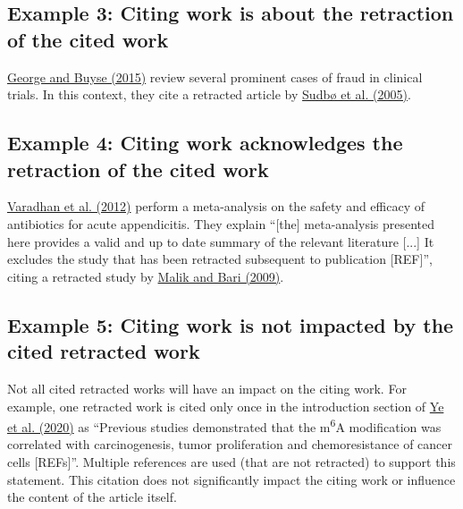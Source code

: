 \documentclass[letterpaper, 12pt]{article}
\begin{document}
\subsection*{Example 3: Citing work is about the retraction of the cited work}
\href{https://pmc.ncbi.nlm.nih.gov/articles/PMC4340084/}{George and Buyse (2015)} review several prominent cases of fraud in clinical trials. In this context, they cite a retracted article by \href{https://doi.org/10.1016/S0140-6736(05)67488-0}{Sudb\o{} et al. (2005)}.

\subsection*{Example 4: Citing work acknowledges the retraction of the cited work}
\href{https://doi.org/10.1136/bmj.e2156}{Varadhan et al. (2012)} perform a meta-analysis on the safety and efficacy of antibiotics for acute appendicitis. They explain ``[the] meta-analysis presented here provides a valid and up to date summary of the relevant literature [...] It excludes the study that has been retracted subsequent to publication [REF]'', citing a retracted study by \href{https://doi.org/10.1007/s11605-009-0835-5}{Malik and Bari (2009)}. 

\subsection*{Example 5: Citing work is not impacted by the cited retracted work}

Not all cited retracted works will have an impact on the citing work. For example, one retracted work is cited only once in the introduction section of \href{https://doi.org/10.7150/thno.51231}{Ye et al. (2020)} as ``Previous studies demonstrated that the m\textsuperscript{6}A modification was correlated with carcinogenesis, tumor proliferation and chemoresistance of cancer cells [REFs]''. Multiple references are used (that are not retracted) to support this statement. This citation does not significantly impact the citing work or influence the content of the article itself.
\end{document}
